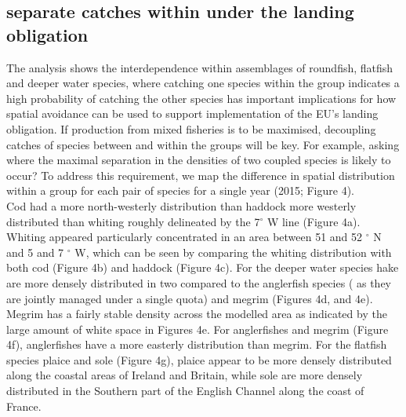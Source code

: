 \documentclass[fleqn,10pt]{wlscirep}
\begin{document}
\begin{linenumbers}
\subsection*{  separate
	catches within  under the landing obligation\deleted[id = CM]{:}\\} The analysis
shows the interdependence within  assemblages of
roundfish, flatfish and deeper water species, where catching one species within
the group indicates a high probability of catching the other
species has important implications for how
spatial avoidance can be used to support implementation of the EU's landing
obligation. If production from mixed fisheries is to be maximised, decoupling
catches of species between and within the groups will be key. For example,
asking where the maximal separation in the densities of two coupled species is
likely to occur? To address this requirement, we map the difference in spatial
distribution within a group for each pair of
species for a single year (2015;
Figure 4). \\

Cod had a more north-westerly distribution than haddock  more westerly distributed than whiting roughly
delineated by the 7$^{\circ}$ W line (Figure 4a). Whiting appeared particularly
concentrated in an area between 51 and 52 $^{\circ}$ N and 5 and 7 $^{\circ}$
W, which can be seen by comparing the whiting distribution with both cod
(Figure 4b) and haddock (Figure 4c). For the deeper water species hake are more
densely distributed in two  compared to the anglerfish species
( as they are jointly managed under a single quota) and megrim
(Figures 4d, and
4e). Megrim has a fairly stable density across the modelled area as indicated
by the large amount of white space in Figures 4e. For anglerfishes and megrim
(Figure 4f), anglerfishes have a more easterly distribution than megrim.  For
the flatfish species plaice and sole (Figure 4g), plaice appear to be more
densely distributed along the coastal areas of Ireland and Britain, while sole
are more densely distributed in the Southern part of the English Channel along
the coast of France.\\


\end{linenumbers}
\end{document}
